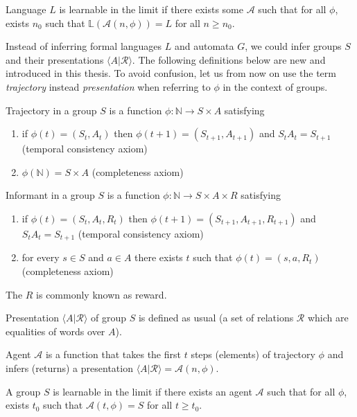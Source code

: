 \documentclass[oneside,english,logo]{amuthesis}
\begin{document}
\begin{definition}
Language $L$ is learnable in the limit if there exists some $\mathcal{A}$ such that for all $\phi$, exists $n_0$ such that $\mathbb{L}(\mathcal{A}(n, \phi))=L$ for all $n \ge n_0$.  
\end{definition}
Instead of inferring formal languages $L$ and automata $G$, we could infer groups $S$ and their presentations $\langle A|\mathcal{R} \rangle$. The following definitions below are new and introduced in this thesis.
To avoid confusion, let us from now on use the term \textit{trajectory} instead \textit{presentation} when referring to $\phi$ in the context of groups. 
\begin{definition}
Trajectory in a group $S$ is a function $\phi : \mathbb{N} \rightarrow S \times A$ satisfying
\begin{enumerate}
	\item if $\phi(t)=(S_t,A_t)$ then $\phi(t+1)=(S_{t+1},A_{t+1})$ and $S_tA_t = S_{t+1}$   (temporal consistency axiom)
	\item $\phi(\mathbb{N}) = S \times A$ (completeness axiom)
\end{enumerate}
\end{definition}
\begin{definition}
Informant in a group $S$ is a function $\phi : \mathbb{N} \rightarrow S \times A \times R$ satisfying
\begin{enumerate}
	\item if $\phi(t)=(S_t,A_t, R_t)$ then $\phi(t+1)=(S_{t+1},A_{t+1},R_{t+1})$ and $S_tA_t = S_{t+1}$   (temporal consistency axiom)
	\item for every $s\in S$ and $a\in A$ there exists $t$ such that $\phi(t) = (s,a,R_t)$ (completeness axiom)
\end{enumerate}
\end{definition}
The $R$ is commonly known as reward.
\begin{definition}
Presentation $\langle A \vert \mathcal{R} \rangle$ of group $S$ is defined as usual (a set of relations $\mathcal{R}$ which are equalities of words over $A$).
\end{definition}
\begin{definition}
Agent $\mathcal{A}$ is a function that takes the first $t$ steps (elements) of trajectory $\phi$ and infers (returns) a presentation $\langle A \vert \mathcal{R} \rangle=\mathcal{A}(n, \phi)$.
\end{definition}
\begin{definition}
A group $S$ is learnable in the limit if there exists an agent $\mathcal{A}$ such that for all $\phi$, exists $t_0$ such that $\mathcal{A}(t, \phi)=S$ for all $t \ge t_0$.  
\end{definition}
\end{document}
